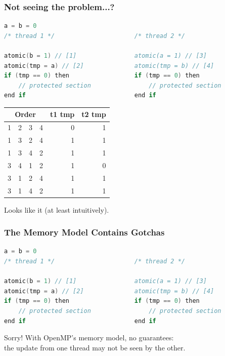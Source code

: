 \begin{frame}[fragile]
  \frametitle{Not seeing the problem...?}

  \begin{lstlisting}[language=C,morekeywords={foreach,pragma,omp,parallel,single,nowait,task,untied,barrier,taskyield,mergeable,final,taskwait,critical}]
                    a = b = 0
/* thread 1 */                      /* thread 2 */

atomic(b = 1) // [1]                atomic(a = 1) // [3]
atomic(tmp = a) // [2]              atomic(tmp = b) // [4]
if (tmp == 0) then                  if (tmp == 0) then
    // protected section                // protected section
end if                              end if
  \end{lstlisting}

  \begin{center}
  \begin{tabular}{r r r r | r r}
    \multicolumn{4}{c|}{Order} & t1 tmp & t2 tmp\\
    \hline
    1 & 2 & 3 & 4 & 0 & 1\\
    1 & 3 & 2 & 4 & 1 & 1\\
    1 & 3 & 4 & 2 & 1 & 1\\
    3 & 4 & 1 & 2 & 1 & 0\\
    3 & 1 & 2 & 4 & 1 & 1\\
    3 & 1 & 4 & 2 & 1 & 1\\
  \end{tabular}
  \end{center}

  

\large
    Looks like it (at least intuitively).


\end{frame}

\begin{frame}[fragile]
  \frametitle{The Memory Model Contains Gotchas}

  \begin{lstlisting}[language=C,morekeywords={foreach,pragma,omp,parallel,single,nowait,task,untied,barrier,taskyield,mergeable,final,taskwait,critical}]
                    a = b = 0
/* thread 1 */                      /* thread 2 */

atomic(b = 1) // [1]                atomic(a = 1) // [3]
atomic(tmp = a) // [2]              atomic(tmp = b) // [4]
if (tmp == 0) then                  if (tmp == 0) then
    // protected section                // protected section
end if                              end if
  \end{lstlisting}

  

\large
    Sorry! With OpenMP's memory model, no guarantees:\\
    the update from one thread may not be seen by the other.


\end{frame}

